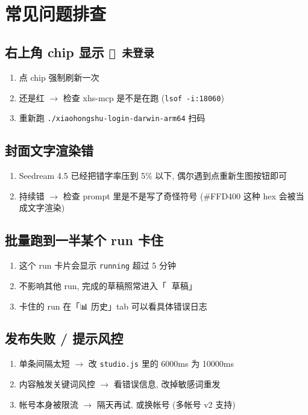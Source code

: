 \documentclass[11pt,a4paper]{article}
\begin{document}
\section{常见问题排查}

\subsection{右上角 chip 显示 \texttt{🔴 未登录}}
\begin{enumerate}[leftmargin=*]
  \item 点 chip 强制刷新一次
  \item 还是红 \(\to\) 检查 xhs-mcp 是不是在跑 (\texttt{lsof -i:18060})
  \item 重新跑 \texttt{./xiaohongshu-login-darwin-arm64} 扫码
\end{enumerate}

\subsection{封面文字渲染错}
\begin{enumerate}[leftmargin=*]
  \item Seedream 4.5 已经把错字率压到 5\% 以下, 偶尔遇到点重新生图按钮即可
  \item 持续错 \(\to\) 检查 prompt 里是不是写了奇怪符号 (\#FFD400 这种 hex 会被当成文字渲染)
\end{enumerate}

\subsection{批量跑到一半某个 run 卡住}
\begin{enumerate}[leftmargin=*]
  \item 这个 run 卡片会显示 \texttt{running} 超过 5 分钟
  \item 不影响其他 run, 完成的草稿照常进入「📝 草稿」
  \item 卡住的 run 在「📊 历史」tab 可以看具体错误日志
\end{enumerate}

\subsection{发布失败 / 提示风控}
\begin{enumerate}[leftmargin=*]
  \item 单条间隔太短 \(\to\) 改 \texttt{studio.js} 里的 6000ms 为 10000ms
  \item 内容触发关键词风控 \(\to\) 看错误信息, 改掉敏感词重发
  \item 帐号本身被限流 \(\to\) 隔天再试, 或换帐号 (多帐号 v2 支持)
\end{enumerate}
\end{document}
